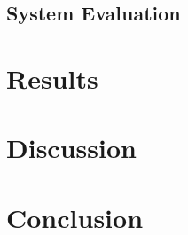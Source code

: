\documentclass[12pt]{article}
\begin{document}
\subsection{System Evaluation}

\section{Results}

\section{Discussion}

\section{Conclusion}



\pagebreak


\end{document}
